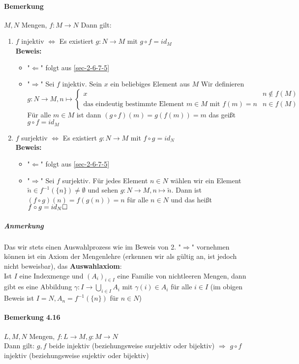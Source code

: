 \documentclass[a4paper]{scrartcl}
\theoremstyle{definition}
\theoremstyle{plain}
\theoremstyle{plain}
\theoremstyle{remark}
\theoremstyle{remark}
\theoremstyle{remark}
\begin{document}
\paragraph{Bemerkung}
\label{sec-2-6-7-7}
$M,N$ Mengen, $f:M\to N$ Dann gilt:
\begin{enumerate}
\item $f$ injektiv $\Leftrightarrow$ Es existiert $g:N\to M$ mit $g\circ f = id_M$ \\
        \textbf{Beweis:}
\begin{itemize}
\item "$\Leftarrow$" folgt aus \ref{sec-2-6-7-5}
\item "$\Rightarrow$" Sei $f$ injektiv. Sein $x$ ein beliebiges Element aus $M$
          Wir definieren \[g:N\to M,n\mapsto \begin{cases} x & n\not\in f(M) \\ \text{das eindeutig bestimmte Element $m\in M$ mit $f(m) = n$} & n\in f(M) \end{cases}\]
          Für alle $m\in M$ ist dann $(g\circ f)(m) = g(f(m)) = m$ das geißt $g\circ f = id_M$
\end{itemize}
\item $f$ surjektiv $\Leftrightarrow$ Es existiert $g:N\to M$ mit $f\circ g = id_N$ \\
        \textbf{Beweis:}
\begin{itemize}
\item "$\Leftarrow$" folgt aus \ref{sec-2-6-7-5}
\item "$\Rightarrow$" Sei $f$ surjektiv. Für jedes Element $n\in N$ wählen wir ein Element $\tilde n\in f^{-1}(\{n\}) \neq \emptyset$ und sehen
$g:N\to M,n\mapsto \tilde n$. Dann ist $(f\circ g)(n) = f(g(n)) = n$ für alle $n\in N$ und das heißt $f\circ g = id_N \hfill\square$
\end{itemize}
\end{enumerate}
\subparagraph{Anmerkung}
\label{sec-2-6-7-7-1}
Das wir stets einen Auswahlprozess wie im Beweis von 2. "$\Rightarrow$" vornehmen können ist ein Axiom der Mengenlehre (erkennen wir als gültig an, ist jedoch nicht beweisbar), das \textbf{Auswahlaxiom}: \\
      Ist $I$ eine Indexmenge und $(A_i)_{i\in I}$ eine Familie von nichtleeren Mengen, dann gibt es eine Abbildung $\gamma:I\to \bigcup_{i\in I} A_i$ mit $\gamma (i) \in A_i$ für alle $i\in I$ (im obigen Beweis ist $I = N,A_n = f^{-1}(\{n\})$ für $n\in N$)
\paragraph{Bemerkung 4.16}
\label{sec-2-6-7-8}
$L,M,N$ Mengen, $f:L\to M, g:M\to N$ \\
     Dann gilt: $g,f$ beide injektiv (beziehungsweise surjektiv oder bijektiv) $\Rightarrow$ $g\circ f$ injektiv (beziehungsweise sujektiv oder bijektiv)
\end{document}
